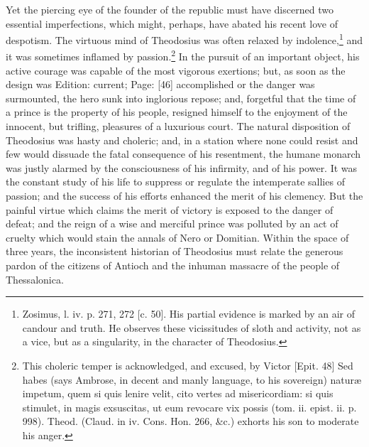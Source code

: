 Yet the piercing eye of the founder of the republic must have discerned two essential imperfections, which might, perhaps, have abated his recent love of despotism. The virtuous mind of Theodosius was often relaxed by indolence,\footnote{Zosimus, l. iv. p. 271, 272 [c. 50]. His partial evidence is marked by an air of candour and truth. He observes these vicissitudes of sloth and activity, not as a vice, but as a singularity, in the character of Theodosius.} and it was sometimes inflamed by passion.\footnote{This choleric temper is acknowledged, and excused, by Victor [Epit. 48] Sed habes (says Ambrose, in decent and manly language, to his sovereign) naturæ impetum, quem si quis lenire velit, cito vertes ad misericordiam: si quis stimulet, in magis exsuscitas, ut eum revocare vix possis (tom. ii. epist. ii. p. 998). Theod. (Claud. in iv. Cons. Hon. 266, \&c.) exhorts his son to moderate his anger.} In the pursuit of an important object, his active courage was capable of the most vigorous exertions; but, as soon as the design was Edition: current; Page: [46] accomplished or the danger was surmounted, the hero sunk into inglorious repose; and, forgetful that the time of a prince is the property of his people, resigned himself to the enjoyment of the innocent, but trifling, pleasures of a luxurious court. The natural disposition of Theodosius was hasty and choleric; and, in a station where none could resist and few would dissuade the fatal consequence of his resentment, the humane monarch was justly alarmed by the consciousness of his infirmity, and of his power. It was the constant study of his life to suppress or regulate the intemperate sallies of passion; and the success of his efforts enhanced the merit of his clemency. But the painful virtue which claims the merit of victory is exposed to the danger of defeat; and the reign of a wise and merciful prince was polluted by an act of cruelty which would stain the annals of Nero or Domitian. Within the space of three years, the inconsistent historian of Theodosius must relate the generous pardon of the citizens of Antioch and the inhuman massacre of the people of Thessalonica.

